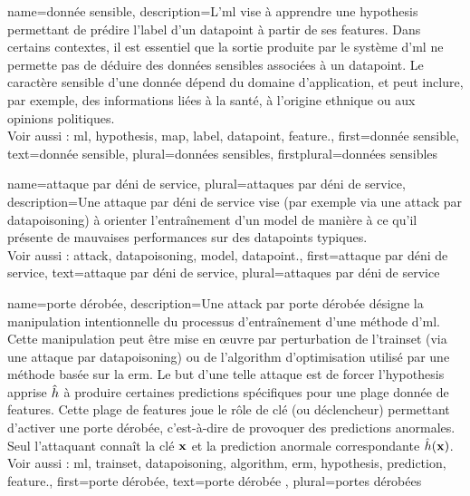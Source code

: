 {name={donnée sensible}, 
	description={L’\gls{ml} vise à apprendre une \gls{hypothesis} permettant de prédire l’\gls{label} d’un \gls{datapoint} à partir de ses \glspl{feature}. 
		Dans certains contextes, il est essentiel que la sortie produite par le système d’\gls{ml} ne permette pas de déduire des données sensibles associées à un \gls{datapoint}. 
		Le caractère sensible d’une donnée dépend du domaine d’application, et peut inclure, par exemple, des informations liées à la santé, à l’origine ethnique ou aux opinions politiques.
		\\ 
		Voir aussi : \gls{ml}, \gls{hypothesis}, \gls{map}, \gls{label}, \gls{datapoint}, \gls{feature}.},
	first={donnée sensible},
	text={donnée sensible}, plural={données sensibles}, firstplural={données sensibles}
}

{name={attaque par déni de service}, plural={attaques par déni de service},
	description={Une 
		attaque par déni de service vise (par exemple via une \gls{attack} par \gls{datapoisoning}) à orienter l’entraînement d’un \gls{model} 
		de manière à ce qu’il présente de mauvaises performances sur des \glspl{datapoint} typiques.
		\\
		Voir aussi : \gls{attack}, \gls{datapoisoning}, \gls{model}, \gls{datapoint}.},
	first={attaque par déni de service},
	text={attaque par déni de service}, plural={attaques par déni de service}
}

{name={porte dérobée}, 
	description={Une \gls{attack} par porte dérobée désigne la manipulation intentionnelle du processus d’entraînement d’une méthode d’\gls{ml}. 
		Cette manipulation peut être mise en œuvre par perturbation de l'\gls{trainset} (via une attaque par \gls{datapoisoning}) ou de l'\gls{algorithm} 
		d’optimisation utilisé par une méthode basée sur la \gls{erm}. Le but d’une telle attaque est de forcer l’\gls{hypothesis} apprise 
		$\hat{h}$ à produire certaines \glspl{prediction} spécifiques pour une plage donnée de \glspl{feature}. 
		Cette plage de \glspl{feature} joue le rôle de clé (ou déclencheur) permettant d’activer une porte dérobée, 
		c’est-à-dire de provoquer des \glspl{prediction} anormales. Seul l’attaquant connaît la clé ${\bf x}$ et la 
		\gls{prediction} anormale correspondante $\hat{h}({\bf x})$.
		\\
		Voir aussi : \gls{ml}, \gls{trainset}, \gls{datapoisoning}, \gls{algorithm}, \gls{erm}, \gls{hypothesis}, \gls{prediction}, \gls{feature}.},
	first={porte dérobée},
	text={porte dérobée} , plural={portes dérobées}
}

